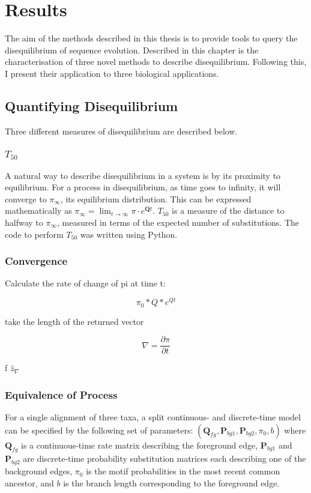 \chapter{Results}

The aim of the methods described in this thesis is to provide tools to query the disequilibrium of sequence evolution. Described in this chapter is the characterisation of three novel methods to describe disequilibrium. Following this, I present their application to three biological applications. 

\section{Quantifying Disequilibrium}
Three different measures of disequilibrium are described below. 

\subsection{$T_{50}$}
A natural way to describe disequilibrium in a system is by its proximity to equilibrium. For a process in disequilibrium, as time goes to infinity, it will converge to $\pi_\infty$, its equilibrium distribution. This can be expressed mathematically as $\pi_\infty = \lim_{t \to \infty}\pi \cdot e^{\mathbf{Q}t}.$ ${T_{50}}$ is a measure of the distance to halfway to $\pi_\infty$, measured in terms of the expected number of substitutions. The code to perform $T_{50}$ was written using Python.


\subsection{Convergence}

Calculate the rate of change of pi at time t:

$$\pi_0 * Q * e^{Qt}$$




take the length of the returned vector

$$\nabla = \frac{\partial \pi}{\partial t}$$

f
$ \hat z_{\nabla}$

\subsection{Equivalence of Process}

For a single alignment of three taxa, a split continuous- and discrete-time model can be specified by the following set of parameters: $( \bm{Q}_{fg}, \bm{P}_{bg1}, \bm{P}_{bg2}, \pi_{0}, b ) $ where $\bm{Q}_{fg}$ is a continuous-time rate matrix describing the foreground edge,  $\bm{P}_{bg1}$ and $\bm{P}_{bg2}$ are discrete-time probability substitution matrices each describing one of the background edges, $\pi_{0}$ is the motif probabilities in the most recent common ancestor, and $b$ is the branch length corresponding to the foreground edge. 

